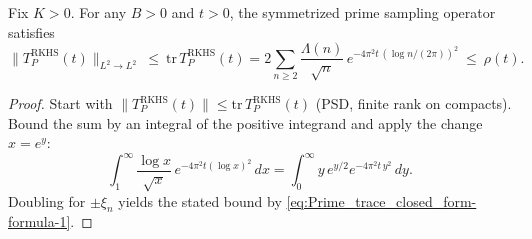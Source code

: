 \begin{lemma}\label{lem:shift-trace-cap}
Fix $K>0$. For any $B>0$ and $t>0$, the symmetrized prime sampling operator satisfies
\begin{equation}\label{eq:Prime_trace_closed_form-formula}
\|T_P^{\mathrm{RKHS}}(t)\|_{L^2\to L^2}\ \le\ \mathrm{tr}\,T_P^{\mathrm{RKHS}}(t)
= 2\sum_{n\ge2}\frac{\Lambda(n)}{\sqrt n}\,e^{-4\pi^2 t\,(\log n/(2\pi))^2}
\ \le\ \rho(t).
\end{equation}
\end{lemma}
\begin{proof}
Start with $\|T_P^{\mathrm{RKHS}}(t)\|\le \mathrm{tr}\,T_P^{\mathrm{RKHS}}(t)$ (PSD, finite rank on compacts).
Bound the sum by an integral of the positive integrand and apply the change $x=e^{y}$:
\begin{equation}\label{eq:Prime_trace_closed_form-formula-2}
\int_1^\infty \frac{\log x}{\sqrt x}\,e^{-4\pi^2 t(\log x)^2}\,dx
= \int_0^\infty y\,e^{y/2}e^{-4\pi^2 t\,y^2}\,dy.
\end{equation}
Doubling for $\pm\xi_n$ yields the stated bound by \eqref{eq:Prime_trace_closed_form-formula-1}.
\end{proof}
